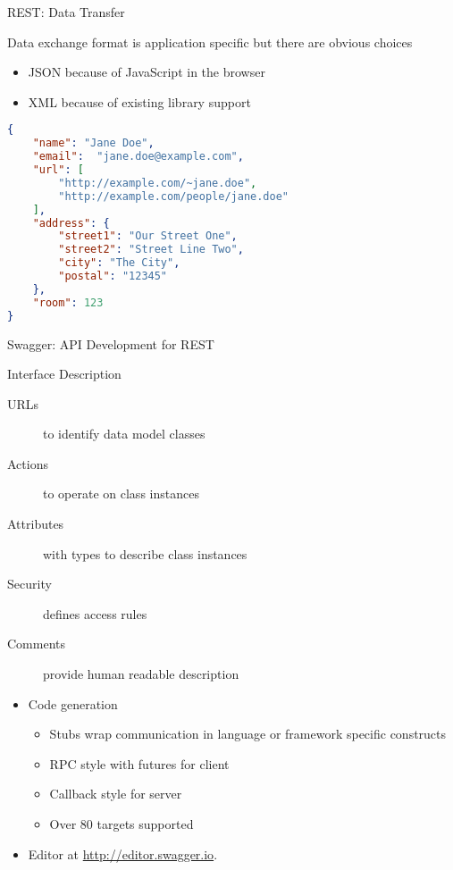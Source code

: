 \begin{frame}[fragile]{REST: Data Transfer}

    Data exchange format is application specific but there are obvious choices
    \begin{itemize}
        \item JSON because of JavaScript in the browser
        \item XML because of existing library support
    \end{itemize}

\begin{lstlisting}[language=json,style=mini]
{
    "name": "Jane Doe",
    "email":  "jane.doe@example.com",
    "url": [
        "http://example.com/~jane.doe",
        "http://example.com/people/jane.doe"
    ],
    "address": {
        "street1": "Our Street One",
        "street2": "Street Line Two",
        "city": "The City",
        "postal": "12345"
    },
    "room": 123
}
\end{lstlisting}
\end{frame}


\begin{frame}{Swagger: API Development for REST}
    \begin{block}{Interface Description}
        \begin{description}
            \item[URLs] to identify data model classes
            \item[Actions] to operate on class instances
            \item[Attributes] with types to describe class instances
            \item[Security] defines access rules
            \item[Comments] provide human readable description
        \end{description}
    \end{block}

    \medskip

    \begin{itemize}
        \item Code generation
        \begin{itemize}
            \item Stubs wrap communication in language or framework specific constructs
            \item RPC style with futures for client
            \item Callback style for server
            \item Over 80 targets supported
        \end{itemize}
        \item Editor at \url{http://editor.swagger.io}.
    \end{itemize}
\end{frame}


